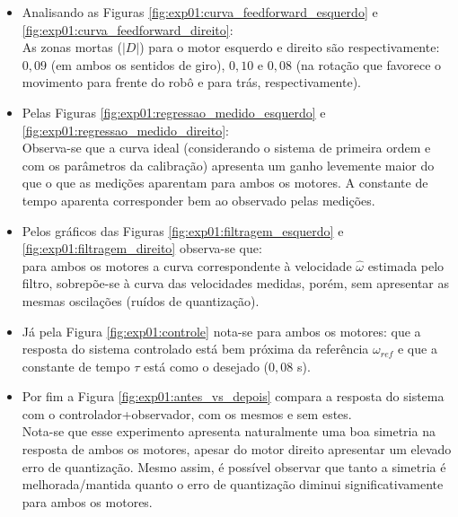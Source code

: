 \begin{itemize}
    \item Analisando as Figuras \ref{fig:exp01:curva_feedforward_esquerdo} e \ref{fig:exp01:curva_feedforward_direito}:\\
        As zonas mortas ($|D|$) para o motor esquerdo e direito são respectivamente: $0,09$ (em ambos os sentidos de giro), $0,10$ e $0,08$ (na rotação que favorece o movimento para frente do robô e para trás, respectivamente).
    \item Pelas Figuras \ref{fig:exp01:regressao_medido_esquerdo} e \ref{fig:exp01:regressao_medido_direito}:\\
        Observa-se que a curva ideal (considerando o sistema de primeira ordem e com os parâmetros da calibração) apresenta um ganho levemente maior do que o que as medições aparentam para ambos os motores. A constante de tempo aparenta corresponder bem ao observado pelas medições.
    \item Pelos gráficos das Figuras \ref{fig:exp01:filtragem_esquerdo} e \ref{fig:exp01:filtragem_direito} observa-se que:\\
        para ambos os motores a curva correspondente à velocidade $\hat{\omega}$ estimada pelo filtro, sobrepõe-se à curva das velocidades medidas, porém, sem apresentar as mesmas oscilações (ruídos de quantização).
    \item Já pela Figura \ref{fig:exp01:controle} nota-se para ambos os motores:
        que a resposta do sistema controlado está bem próxima da referência $\omega_{ref}$ e que a constante de tempo $\tau$ está como o desejado ($0,08$ s).
    \item Por fim a Figura \ref{fig:exp01:antes_vs_depois} compara a resposta do sistema com o controlador+observador, com os mesmos e sem estes. \\
        Nota-se que esse experimento apresenta naturalmente uma boa simetria na resposta de ambos os motores, apesar do motor direito apresentar um elevado erro de quantização. Mesmo assim, é possível observar que tanto a simetria é melhorada/mantida quanto o erro de quantização diminui significativamente para ambos os motores.
\end{itemize}

